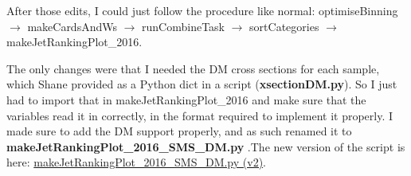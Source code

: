 After those edits, I could just follow the procedure like normal: optimiseBinning $\rightarrow$ makeCardsAndWs $\rightarrow$ runCombineTask $\rightarrow$ sortCategories $\rightarrow$ makeJetRankingPlot\_2016.

The only changes were that I needed the DM cross sections for each sample, which Shane provided as a Python dict in a script (\textbf{xsectionDM.py}). So I just had to import that in makeJetRankingPlot\_2016 and make sure that the variables read it in correctly, in the format required to implement it properly. I made sure to add the DM support properly, and as such renamed it to \textbf{makeJetRankingPlot\_2016\_SMS\_DM.py} .The new version of the script is here: \href{run:sec23/makeJetRankingPlot_2016_SMS_DMv2.py}{makeJetRankingPlot\_2016\_SMS\_DM.py (v2)}.
